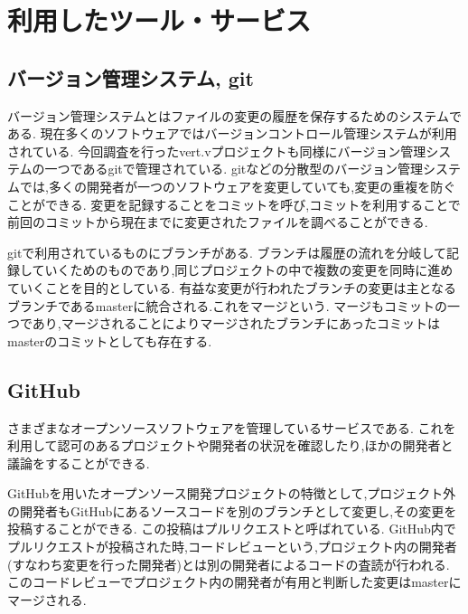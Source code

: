 \documentclass{fose2016}           %
\begin{document}
\section{利用したツール・サービス}\label{ツール・サービス}
\subsection{バージョン管理システム, git}
バージョン管理システムとはファイルの変更の履歴を保存するためのシステムである.
現在多くのソフトウェアではバージョンコントロール管理システムが利用されている.
今回調査を行ったvert.vプロジェクトも同様にバージョン管理システムの一つであるgitで管理されている.
gitなどの分散型のバージョン管理システムでは,多くの開発者が一つのソフトウェアを変更していても,変更の重複を防ぐことができる.
変更を記録することをコミットを呼び,コミットを利用することで前回のコミットから現在までに変更されたファイルを調べることができる.

gitで利用されているものにブランチがある.
ブランチは履歴の流れを分岐して記録していくためのものであり,同じプロジェクトの中で複数の変更を同時に進めていくことを目的としている.
有益な変更が行われたブランチの変更は主となるブランチであるmasterに統合される.これをマージという.
マージもコミットの一つであり,マージされることによりマージされたブランチにあったコミットはmasterのコミットとしても存在する.

\subsection{GitHub}
さまざまなオープンソースソフトウェアを管理しているサービスである.
これを利用して認可のあるプロジェクトや開発者の状況を確認したり,ほかの開発者と議論をすることができる.

GitHubを用いたオープンソース開発プロジェクトの特徴として,プロジェクト外の開発者もGitHubにあるソースコードを別のブランチとして変更し,その変更を投稿することができる.
この投稿はプルリクエストと呼ばれている.
GitHub内でプルリクエストが投稿された時,コードレビューという,プロジェクト内の開発者(すなわち変更を行った開発者)とは別の開発者によるコードの査読が行われる.
このコードレビューでプロジェクト内の開発者が有用と判断した変更はmasterにマージされる.


\end{document}
